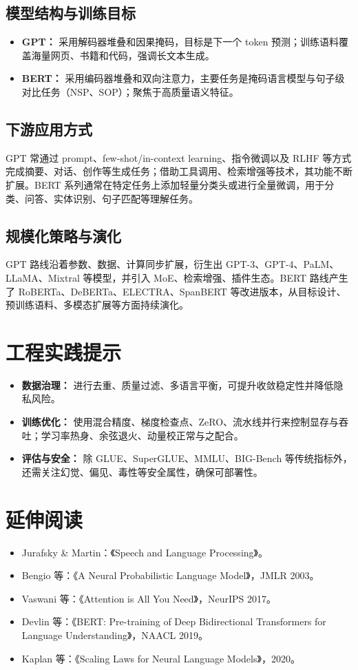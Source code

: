 \documentclass[UTF8,zihao=-4]{ctexart}
\begin{document}
\subsection{模型结构与训练目标}
\begin{itemize}
  \item \textbf{GPT：} 采用解码器堆叠和因果掩码，目标是下一个 token 预测；训练语料覆盖海量网页、书籍和代码，强调长文本生成。
  \item \textbf{BERT：} 采用编码器堆叠和双向注意力，主要任务是掩码语言模型与句子级对比任务（NSP、SOP）；聚焦于高质量语义特征。
\end{itemize}

\subsection{下游应用方式}
GPT 常通过 prompt、few-shot/in-context learning、指令微调以及 RLHF 等方式完成摘要、对话、创作等生成任务；借助工具调用、检索增强等技术，其功能不断扩展。BERT 系列通常在特定任务上添加轻量分类头或进行全量微调，用于分类、问答、实体识别、句子匹配等理解任务。

\subsection{规模化策略与演化}
GPT 路线沿着参数、数据、计算同步扩展，衍生出 GPT-3、GPT-4、PaLM、LLaMA、Mixtral 等模型，并引入 MoE、检索增强、插件生态。BERT 路线产生了 RoBERTa、DeBERTa、ELECTRA、SpanBERT 等改进版本，从目标设计、预训练语料、多模态扩展等方面持续演化。

\section{工程实践提示}
\begin{itemize}
  \item \textbf{数据治理：} 进行去重、质量过滤、多语言平衡，可提升收敛稳定性并降低隐私风险。
  \item \textbf{训练优化：} 使用混合精度、梯度检查点、ZeRO、流水线并行来控制显存与吞吐；学习率热身、余弦退火、动量校正常与之配合。
  \item \textbf{评估与安全：} 除 GLUE、SuperGLUE、MMLU、BIG-Bench 等传统指标外，还需关注幻觉、偏见、毒性等安全属性，确保可部署性。
\end{itemize}

\section*{延伸阅读}
\begin{itemize}
  \item Jurafsky \& Martin：《Speech and Language Processing》。
  \item Bengio 等：《A Neural Probabilistic Language Model》，JMLR 2003。
  \item Vaswani 等：《Attention is All You Need》，NeurIPS 2017。
  \item Devlin 等：《BERT: Pre-training of Deep Bidirectional Transformers for Language Understanding》，NAACL 2019。
  \item Kaplan 等：《Scaling Laws for Neural Language Models》，2020。
\end{itemize}
\end{document}
